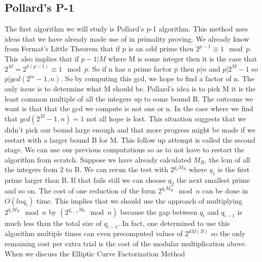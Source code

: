 \documentclass{article}
\begin{document}
\subsection{Pollard's P-1}
The first algorithm we will study is Pollard's p-1 algorithm. This method uses ideas that we have already made use of in primality proving. We already know from Fermat's Little Theorem that if p is an odd prime then $2^{p-1} \equiv 1 \mod p$. This also implies that if $p - 1 | M$ where M is some integer then it is the case that $2^M = 2^{k ( p-1 ) }  \equiv 1 \mod p$. So if n has a prime factor p then $p | n$ and $ p | 2^M - 1 $ so $ p | gcd ( 2^m - 1, n)$. So by computing this gcd, we hope to find a factor of n. The only issue is to determine what M should be. Pollard's idea is to pick M it is the least common multiple of all the integers up to some bound B. The outcome we want is that that the gcd we compute is not one or n. In the case where we find that $gcd(2^M - 1, n) = 1$ not all hope is lost. This situation suggests that we didn't pick our bound large enough and that more progress might be made if we restart with a larger bound B for M.  This follow up attempt is called the second stage. We can use our previous computations so as to not have to restart the algorithm from scratch. Suppose we have already calculated $M_B$, the lcm of all the integers from 2 to B. We can rerun the test with $2^{q_1 M_B}$ where $q_1$ is the first prime larger than B. If that fails still we can choose $q_2$ the next smallest prime and so on. The cost of one reduction of the form $2^{q_i M_B} \mod n$ can be done in $O(ln q_i)$ time. This implies that we should use the approach of multiplying $2^{q_i M_B} \mod n $ by $(2^{q_{i-1} M_b} \mod n)$ because the gap between $q_i$ and $q_{i-1}$ is  much less than the total size of $q_{i-1}$. In fact, one determined to use this algorithm multiple times can even precomputed values of $2^{d M(B)}$ so the only remaining cost per extra trial is the cost of the modular multiplication above. When we discuss the Elliptic Curve Factorization Method 
\end{document}

